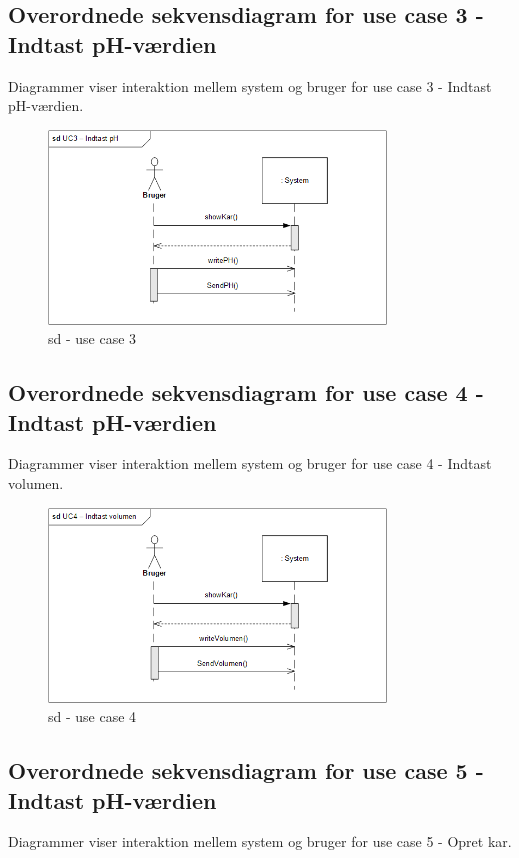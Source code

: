 \subsection{Overordnede sekvensdiagram for use case 3 - Indtast pH-værdien}
Diagrammer viser interaktion mellem system og bruger for use case 3 - Indtast pH-værdien.

\begin{figure}[H]
    \centering
    \includegraphics[width=0.8\textwidth]{Systemarkitektur/OverordnedeSekvensdiagrammer/sd_UC3.PNG}
    \caption{sd - use case 3}
    \label{fig:sd_UC3}
\end{figure}

\subsection{Overordnede sekvensdiagram for use case 4 - Indtast pH-værdien}
Diagrammer viser interaktion mellem system og bruger for use case 4 - Indtast volumen.

\begin{figure}[H]
    \centering
    \includegraphics[width=0.8\textwidth]{Systemarkitektur/OverordnedeSekvensdiagrammer/sd_UC4.PNG}
    \caption{sd - use case 4}
    \label{fig:sd_UC4}
\end{figure}

\subsection{Overordnede sekvensdiagram for use case 5 - Indtast pH-værdien}
Diagrammer viser interaktion mellem system og bruger for use case 5 - Opret kar.

